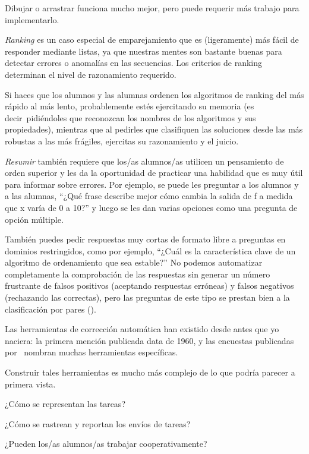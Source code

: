 Dibujar o arrastrar funciona mucho mejor, 
pero puede requerir más trabajo para implementarlo.


\emph{Ranking} es un caso especial de emparejamiento 
que es (ligeramente) más fácil de responder mediante listas, 
ya que nuestras mentes son bastante buenas para detectar errores o anomalías en las secuencias.
Los criterios de ranking determinan el nivel de razonamiento requerido.

Si haces que los alumnos y las alumnas ordenen los algoritmos de ranking del más rápido al más lento, probablemente estés ejercitando su memoria 
(es decir\  pidiéndoles que reconozcan los nombres de los algoritmos y sus propiedades), mientras que al pedirles que clasifiquen las soluciones desde las más robustas a las más frágiles, ejercitas su razonamiento y el juicio.

\emph{Resumir} también requiere que los/as alumnos/as utilicen un pensamiento de orden superior y les da la oportunidad de practicar una habilidad que es muy útil para informar sobre errores.
Por ejemplo, 
se puede les preguntar a los alumnos y a las alumnas,
 ``¿Qué frase describe mejor cómo cambia la salida de f a medida que  x varía de 0 a 10?'' 
y luego se les dan varias opciones como una pregunta de opción múltiple.

También puedes pedir respuestas muy cortas de formato libre a preguntas en dominios restringidos, como por ejemplo, ``¿Cuál es la característica clave de un algoritmo de ordenamiento que sea estable?''
No podemos automatizar completamente la comprobación de las respuestas sin generar un número frustrante de falsos positivos 
(aceptando respuestas erróneas) 
y falsos negativos (rechazando las correctas), 
pero las preguntas de este tipo se prestan bien a la clasificación por pares 
().


Las herramientas de corrección automática han existido desde antes que yo naciera: la primera mención publicada data de 1960, y las encuestas publicadas por~\cite{Douc2005,Ihan2010} nombran muchas herramientas específicas.

Construir tales herramientas es mucho más complejo de lo que podría parecer a primera vista.

¿Cómo se representan las tareas?

¿Cómo se rastrean y reportan los envíos de tareas?

¿Pueden los/as alumnos/as trabajar cooperativamente?

